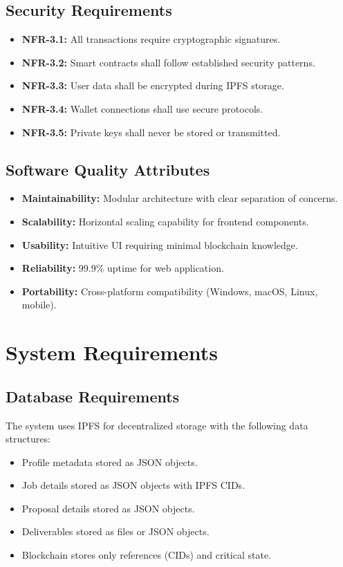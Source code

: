 \subsection{Security Requirements}

\begin{itemize}
    \item \textbf{NFR-3.1:} All transactions require cryptographic signatures.
    \item \textbf{NFR-3.2:} Smart contracts shall follow established security patterns.
    \item \textbf{NFR-3.3:} User data shall be encrypted during IPFS storage.
    \item \textbf{NFR-3.4:} Wallet connections shall use secure protocols.
    \item \textbf{NFR-3.5:} Private keys shall never be stored or transmitted.
\end{itemize}

\subsection{Software Quality Attributes}

\begin{itemize}
    \item \textbf{Maintainability:} Modular architecture with clear separation of concerns.
    \item \textbf{Scalability:} Horizontal scaling capability for frontend components.
    \item \textbf{Usability:} Intuitive UI requiring minimal blockchain knowledge.
    \item \textbf{Reliability:} 99.9\% uptime for web application.
    \item \textbf{Portability:} Cross-platform compatibility (Windows, macOS, Linux, mobile).
\end{itemize}

\section{System Requirements}

\subsection{Database Requirements}

The system uses IPFS for decentralized storage with the following data structures:

\begin{itemize}
    \item Profile metadata stored as JSON objects.
    \item Job details stored as JSON objects with IPFS CIDs.
    \item Proposal details stored as JSON objects.
    \item Deliverables stored as files or JSON objects.
    \item Blockchain stores only references (CIDs) and critical state.
\end{itemize}

